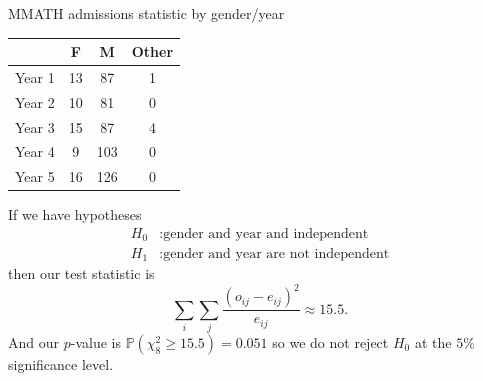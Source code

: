 \documentclass{article}
\begin{document}
\begin{example}
  MMATH admissions statistic by gender/year
  \begin{center}
	  \begin{tabular}{c | c c c}
		  \hline
		   & F & M  & Other \\
		  \hline
		  Year 1 & 13 & 87 & 1 \\
		  Year 2 & 10 & 81 & 0 \\
		  Year 3 & 15 & 87 & 4 \\
		  Year 4 & 9 & 103 & 0 \\
		  Year 5 & 16 & 126 & 0 \\
\hline
	  \end{tabular}
  \end{center}
  If we have hypotheses
  \begin{align*}
	  H_0&: \text{gender and year and independent} \\
	  H_1&: \text{gender and year are not independent}
  \end{align*}
  then our test statistic is
  \[
	  \sum_i \sum_j \frac{(o_{ij} - e_{ij})^2}{e_{ij}} \approx 15.5.
  \]
  And our $ p $-value is $ \mathbb P(\chi^2_8\ge 15.5) = 0.051 $ so we do not reject $ H_0 $ at the $ 5\% $ significance level.
\end{example}
\end{document}
